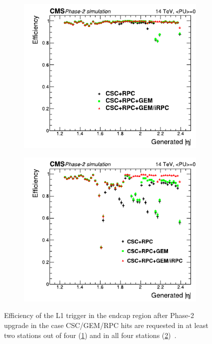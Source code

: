 	\begin{figure}[H]
		\begin{subfigure}{0.5\linewidth}
			\centering
			\includegraphics[width=\linewidth]{fig/chapt3/EMTF-eff-2of4.pdf}
			\caption{\label{fig:EMTF-eff:A}}
		\end{subfigure}
		\begin{subfigure}{0.5\linewidth}
			\centering
			\includegraphics[width=\linewidth]{fig/chapt3/EMTF-eff-4of4.pdf}
			\caption{\label{fig:EMTF-eff:B}}
		\end{subfigure}
		\caption{\label{fig:EMTF-eff} Efficiency of the L1 trigger in the endcap region after Phase-2 upgrade in the case CSC/GEM/RPC hits are requested in at least two stations out of four (\ref{fig:EMTF-eff:A}) and in all four stations (\ref{fig:EMTF-eff:B})~\cite{PHASEIITP}.}
	\end{figure}

